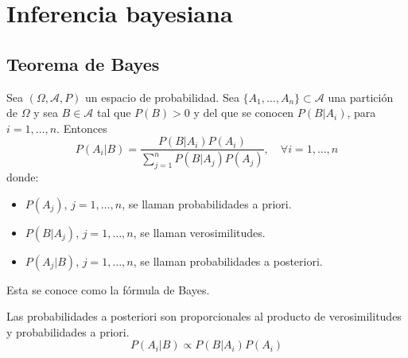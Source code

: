 \chapter{Inferencia bayesiana}
\section{Teorema de Bayes}
\begin{theorem}
    Sea $(\Omega, \mathcal{A}, P)$ un espacio de probabilidad.
    Sea $\{A_1, \dots, A_n\} \subset \mathcal{A}$ una partición de $\Omega$ y sea $B \in \mathcal{A}$ tal que $P(B) > 0$ y del que se conocen $P(B|A_i)$, para $i = 1, \dots, n$.
    Entonces
    $$P(A_i|B) = \frac{P(B|A_i)P(A_i)}{\sum_{j=1}^n P(B|A_j)P(A_j)}, \quad \forall i = 1, \dots, n$$
    donde:
    \begin{itemize}
        \item $P(A_j)$, $j = 1, \dots, n$, se llaman probabilidades a priori.
        \item $P(B|A_j)$, $j = 1, \dots, n$, se llaman verosimilitudes.
        \item $P(A_j|B)$, $j= 1, \dots, n$, se llaman probabilidades a posteriori.
    \end{itemize}

    Esta se conoce como la fórmula de Bayes.
\end{theorem}

\begin{remark}
    Las probabilidades a posteriori son proporcionales al producto de verosimilitudes y probabilidades a priori.
    $$P(A_i|B) \propto P(B|A_i)P(A_i)$$
\end{remark}